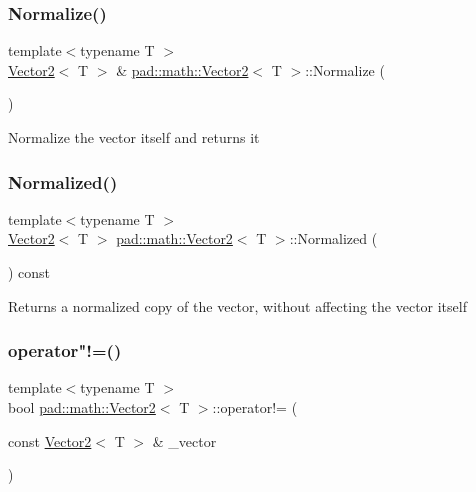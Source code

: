 \subsubsection{\texorpdfstring{Normalize()}{Normalize()}}
{\footnotesize\ttfamily template$<$typename T $>$ \\
\mbox{\hyperlink{structpad_1_1math_1_1_vector2}{Vector2}}$<$ T $>$ \& \mbox{\hyperlink{structpad_1_1math_1_1_vector2}{pad\+::math\+::\+Vector2}}$<$ T $>$\+::Normalize (\begin{DoxyParamCaption}{ }\end{DoxyParamCaption})}

Normalize the vector itself and returns it \mbox{\label{structpad_1_1math_1_1_vector2_ad940f1a2e4e6c58f742e85327493750a}} 
\subsubsection{\texorpdfstring{Normalized()}{Normalized()}}
{\footnotesize\ttfamily template$<$typename T $>$ \\
\mbox{\hyperlink{structpad_1_1math_1_1_vector2}{Vector2}}$<$ T $>$ \mbox{\hyperlink{structpad_1_1math_1_1_vector2}{pad\+::math\+::\+Vector2}}$<$ T $>$\+::Normalized (\begin{DoxyParamCaption}{ }\end{DoxyParamCaption}) const}

Returns a normalized copy of the vector, without affecting the vector itself \mbox{\label{structpad_1_1math_1_1_vector2_a3fc28d0cce711c660bf2b462aeaf41f2}} 
\subsubsection{\texorpdfstring{operator"!=()}{operator!=()}}
{\footnotesize\ttfamily template$<$typename T $>$ \\
bool \mbox{\hyperlink{structpad_1_1math_1_1_vector2}{pad\+::math\+::\+Vector2}}$<$ T $>$\+::operator!= (\begin{DoxyParamCaption}\item[{const \mbox{\hyperlink{structpad_1_1math_1_1_vector2}{Vector2}}$<$ T $>$ \&}]{\+\_\+vector }\end{DoxyParamCaption})}

